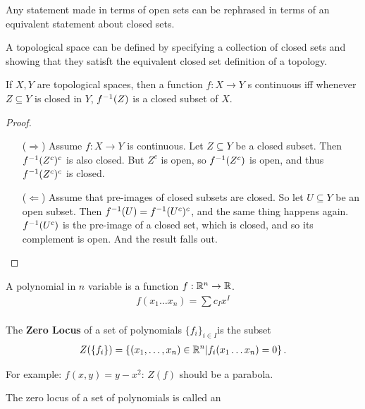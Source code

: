 \message{ !name(2.21.23.math.171.tex)}\documentclass[12pt, twosided]{article}
\begin{document}
\begin{idea}
  Any statement made in terms of open sets can be rephrased in terms of an equivalent statement about closed sets.
\end{idea}
\begin{fact}
  A topological space can be defined by specifying a collection of closed sets and showing that they satisft the equivalent closed set definition of a topology.
\end{fact}
\begin{prop}
  If \(X,Y\) are topological spaces, then a function \(f: X \to Y\) s continuous iff whenever \(Z \subseteq Y\) is closed in \(Y\), \(f^{-1}(Z)\) is a closed subset of \(X\).
\end{prop}
\begin{proof}
  \begin{enumerate}
  \item [(\(\Rightarrow\))] Assume \(f: X \to Y\) is continuous. Let \(Z \subseteq Y\)  be a closed subset. Then \(f^{-1}(Z^c)^c\) is also closed. But \(Z^c\) is open, so \(f^{-1}(Z^c)\) is open, and thus \(f^{-1}(Z^c)^c\) is closed.
  \item [(\(\Leftarrow\))] Assume that pre-images of closed subsets are closed. So let \(U \subseteq Y\) be an open subset. Then \(f^{-1}(U) = f^{-1}(U^c)^c\), and the same thing happens again. \(f^{-1}(U^c)\) is the pre-image of a closed set, which is closed, and so its complement is open. And the result falls out.
  \end{enumerate}
\end{proof}

\begin{df}
  A polynomial in \(n\) variable is a function \(f: \mathbb{R}^n \to \mathbb{R}\).
  \begin{align*}
    f(x_1 \ldots x_n) = \sum c_Ix^I \\
  \end{align*}

  The \textbf{Zero Locus} of a set of polynomials \(\{f_i\}_{i\in I}\)is the subset
  \begin{align*}
    Z(\{f_i\}) = \left\{ (x_1, \ldots, x_n) \in \mathbb{R}^n \middle\vert f_i(x_1 \ldots x_n) = 0 \right\}.
  \end{align*}
\end{df}

For example: \(f(x, y) = y - x^2\):
\(Z(f)\) should be a parabola.

\begin{df}
  The zero locus of a set of polynomials is called an 
\end{df}
\end{document}
